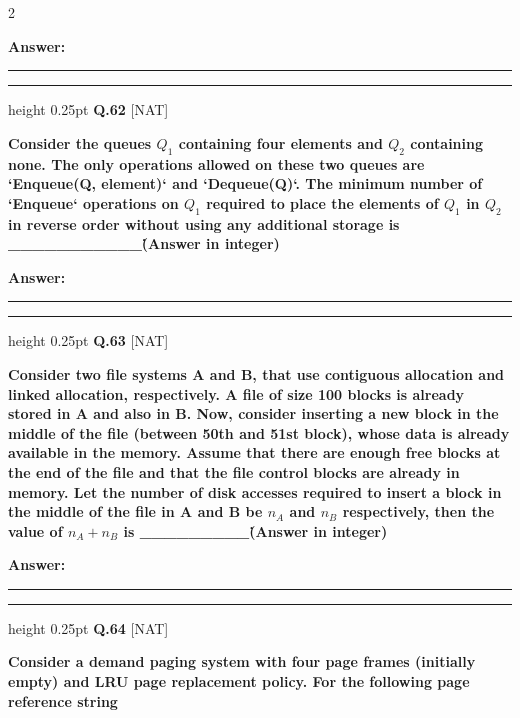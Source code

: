 \documentclass[a4paper,10pt,twoside]{article}
\begin{document}
\begin{multicols}{2}
\par\vspace{3pt}\noindent\textbf{Answer:} \rule{3.2cm}{0.4pt}
\par\vspace{6pt}\hrule height 0.25pt\vspace{6pt}
\noindent\textbf{Q.62} \hfill {\footnotesize\textsf{[NAT]}}
\par\vspace{2pt}
{\bfseries Consider the queues $Q_1$ containing four elements and $Q_2$ containing none. The only operations allowed on these two queues are `Enqueue(Q, element)` and `Dequeue(Q)`. The minimum number of `Enqueue` operations on $Q_1$ required to place the elements of $Q_1$ in $Q_2$ in reverse order without using any additional storage is \_\_\_\_\_\_\_\_\_\_\_\. (Answer in integer) \par}
\par\vspace{3pt}\noindent\textbf{Answer:} \rule{3.2cm}{0.4pt}
\par\vspace{6pt}\hrule height 0.25pt\vspace{6pt}
\noindent\textbf{Q.63} \hfill {\footnotesize\textsf{[NAT]}}
\par\vspace{2pt}
{\bfseries Consider two file systems A and B, that use contiguous allocation and linked allocation, respectively. A file of size 100 blocks is already stored in A and also in B. Now, consider inserting a new block in the middle of the file (between 50th and 51st block), whose data is already available in the memory. Assume that there are enough free blocks at the end of the file and that the file control blocks are already in memory. Let the number of disk accesses required to insert a block in the middle of the file in A and B be $n_A$ and $n_B$ respectively, then the value of $n_A + n_B$ is \_\_\_\_\_\_\_\_\_\. (Answer in integer) \par}
\par\vspace{3pt}\noindent\textbf{Answer:} \rule{3.2cm}{0.4pt}
\par\vspace{6pt}\hrule height 0.25pt\vspace{6pt}
\noindent\textbf{Q.64} \hfill {\footnotesize\textsf{[NAT]}}
\par\vspace{2pt}
{\bfseries Consider a demand paging system with four page frames (initially empty) and LRU page replacement policy. For the following page reference string
}
\end{multicols}
\end{document}
